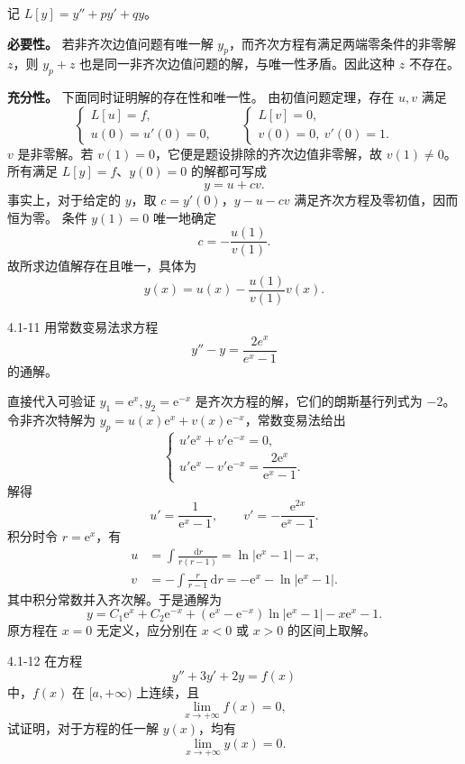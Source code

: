 \documentclass[UTF8,a4paper,11pt]{ctexart}
\newcommand{\dd}{\,\mathrm d}
\newcommand{\e}{\mathrm e}
\begin{document}
\begin{solution}
记 $L[y]=y''+py'+qy$。

\textbf{必要性。} 若非齐次边值问题有唯一解 $y_p$，而齐次方程有满足两端零条件的非零解 $z$，则 $y_p+z$ 也是同一非齐次边值问题的解，与唯一性矛盾。因此这种 $z$ 不存在。

\textbf{充分性。} 下面同时证明解的存在性和唯一性。
由初值问题定理，存在 $u,v$ 满足
\[
\begin{cases}L[u]=f,\\u(0)=u'(0)=0,\end{cases}
\qquad
\begin{cases}L[v]=0,\\v(0)=0,\ v'(0)=1.\end{cases}
\]
$v$ 是非零解。若 $v(1)=0$，它便是题设排除的齐次边值非零解，故 $v(1)\ne0$。
所有满足 $L[y]=f$、$y(0)=0$ 的解都可写成
\[
y=u+cv.
\]
事实上，对于给定的 $y$，取 $c=y'(0)$，$y-u-cv$ 满足齐次方程及零初值，因而恒为零。
条件 $y(1)=0$ 唯一地确定
\[
c=-\frac{u(1)}{v(1)}.
\]
故所求边值解存在且唯一，具体为
\[
\boxed{y(x)=u(x)-\frac{u(1)}{v(1)}v(x).}
\]
\end{solution}

\begin{problem}{4.1-11}
用常数变易法求方程
  \[
    y''-y=\frac{2e^x}{e^x-1}
  \]
  的通解。
\end{problem}

\begin{solution}
直接代入可验证 $y_1=\e^x,y_2=\e^{-x}$ 是齐次方程的解，它们的朗斯基行列式为 $-2$。
令非齐次特解为 $y_p=u(x)\e^x+v(x)\e^{-x}$，常数变易法给出
\[
\begin{cases}
u'\e^x+v'\e^{-x}=0,\\
u'\e^x-v'\e^{-x}=\dfrac{2\e^x}{\e^x-1}.
\end{cases}
\]
解得
\[
u'=\frac1{\e^x-1},\qquad v'=-\frac{\e^{2x}}{\e^x-1}.
\]
积分时令 $r=\e^x$，有
\[
\begin{aligned}
u&=\int\frac{\dd r}{r(r-1)}=\ln|\e^x-1|-x,\\
v&=-\int\frac{r}{r-1}\dd r=-\e^x-\ln|\e^x-1|.
\end{aligned}
\]
其中积分常数并入齐次解。于是通解为
\[
\boxed{y=C_1\e^x+C_2\e^{-x}
+(\e^x-\e^{-x})\ln|\e^x-1|-x\e^x-1.}
\]
原方程在 $x=0$ 无定义，应分别在 $x<0$ 或 $x>0$ 的区间上取解。
\end{solution}

\begin{problem}{4.1-12}
在方程
  \[
    y''+3y'+2y=f(x)
  \]
  中，$f(x)$ 在 $[a,+\infty)$ 上连续，且
  \[
    \lim_{x\to+\infty}f(x)=0,
  \]
  试证明，对于方程的任一解 $y(x)$，均有
  \[
    \lim_{x\to+\infty}y(x)=0.
  \]
\end{problem}
\end{document}
